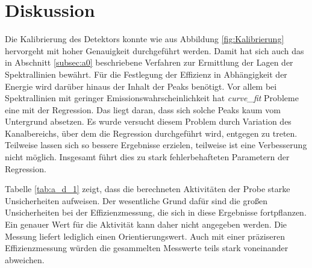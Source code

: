\section{Diskussion}
\label{sec:Diskussion}
Die Kalibrierung des Detektors konnte wie aus Abbildung \ref{fig:Kalibrierung} hervorgeht mit hoher Genauigkeit durchgeführt werden.
Damit hat sich auch das in Abschnitt \ref{subsec:a0} beschriebene Verfahren zur Ermittlung der Lagen der Spektrallinien bewährt.
Für die Festlegung der Effizienz in Abhängigkeit der Energie wird darüber hinaus der Inhalt der Peaks benötigt.
Vor allem bei Spektrallinien mit geringer Emissionswahrscheinlichkeit hat \textit{curve_fit} Probleme eine mit der Regression. 
Das liegt daran, dass sich solche Peaks kaum vom Untergrund absetzen.
Es wurde versucht diesem Problem durch Variation des Kanalbereichs, über dem die Regression durchgeführt wird, entgegen zu treten.
Teilweise lassen sich so bessere Ergebnisse erzielen, teilweise ist eine Verbesserung nicht möglich.
Insgesamt führt dies zu stark fehlerbehafteten Parametern der Regression.

Tabelle \ref{tab:a_d_1} zeigt, dass die berechneten Aktivitäten der Probe starke Unsicherheiten aufweisen.
Der wesentliche Grund dafür sind die großen Unsicherheiten bei der Effizienzmessung, die sich in diese Ergebnisse fortpflanzen.
Ein genauer Wert für die Aktivität kann daher nicht angegeben werden. 
Die Messung liefert lediglich einen Orientierungswert.
Auch mit einer präziseren Effizienzmessung würden die gesammelten Messwerte teils stark voneinander abweichen.
